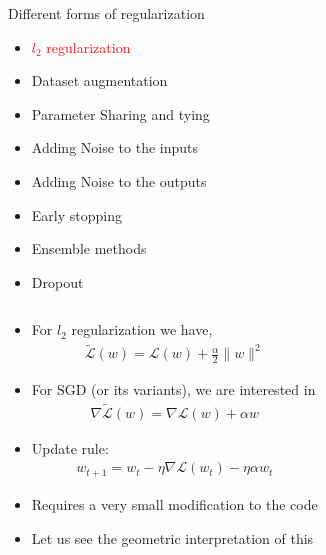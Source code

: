 	\begin{frame}
\end{frame}

\begin{frame}
	\vspace{4em}
	\begin{overlayarea}{\textwidth}{\textheight}
		\begin{block}{Different forms of regularization}
			\begin{itemize}
				\item \textcolor{red}{$l_2$ regularization}
				\item Dataset augmentation
				\item Parameter Sharing and tying
				\item Adding Noise to the inputs 
				\item Adding Noise to the outputs
				\item Early stopping
				\item Ensemble methods
				\item Dropout
			\end{itemize}
		\end{block}
	\end{overlayarea}
\end{frame}

	
\begin{frame}
	\begin{columns}
		\column{\textwidth}
		\vspace{2em}
		\begin{overlayarea}{\textwidth}{\textheight}
			\begin{itemize}
				\item<1-> For $l_2$ regularization we have,
				\begin{align*} 
					\widetilde{\mathscr{L}}(w) = \mathscr{L}(w) + \frac{\alpha}{2} \|w\|^2
				\end{align*}
				\item<2-> For SGD (or its variants), we are interested in
				\begin{align*}
					\nabla \widetilde{\mathscr{L}}(w) =  \nabla \mathscr{L}(w) + \alpha w
				\end{align*}
				\item<3-> Update rule:
				\begin{align*}
				w_{t+1} = w_t - \eta \nabla \mathscr{L}(w_t) - \eta \alpha w_t
				\end{align*}
				\item<4-> Requires a very small modification to the code
									
				\item<5-> Let us see the geometric interpretation of this
			\end{itemize}
		\end{overlayarea}
	\end{columns}
\end{frame}
	
